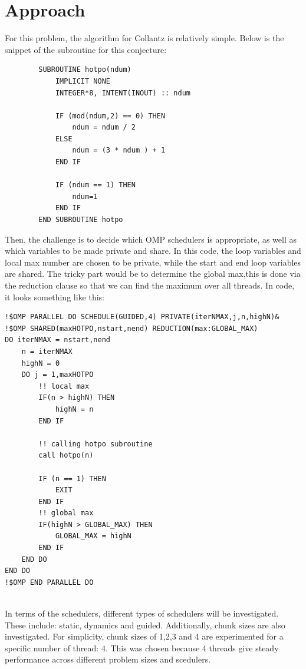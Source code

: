 \documentclass[12pt]{article}
\begin{document}
        \section{Approach}
            For this problem, the algorithm for Collantz is relatively simple. Below is the snippet of the subroutine for this conjecture:
            \begin{lstlisting}
        SUBROUTINE hotpo(ndum)
            IMPLICIT NONE
            INTEGER*8, INTENT(INOUT) :: ndum

            IF (mod(ndum,2) == 0) THEN
                ndum = ndum / 2 
            ELSE
                ndum = (3 * ndum ) + 1
            END IF

            IF (ndum == 1) THEN
                ndum=1
            END IF
        END SUBROUTINE hotpo                
            \end{lstlisting}
        \newpage
        \noindent
        Then, the challenge is to decide which OMP schedulers is appropriate, as well as which variables to be made private and share.  In this code, the loop variables and local max number are chosen to be private, while the start and end loop variables are shared.  The tricky part would be to determine the global max,this is done via the reduction clause so that we can find the maximum over all threads. In code, it looks something like this:

        \begin{lstlisting}
!$OMP PARALLEL DO SCHEDULE(GUIDED,4) PRIVATE(iterNMAX,j,n,highN)&
!$OMP SHARED(maxHOTPO,nstart,nend) REDUCTION(max:GLOBAL_MAX) 
DO iterNMAX = nstart,nend
    n = iterNMAX
    highN = 0
    DO j = 1,maxHOTPO         
        !! local max 
        IF(n > highN) THEN 
            highN = n 
        END IF
        
        !! calling hotpo subroutine 
        call hotpo(n)

        IF (n == 1) THEN 
            EXIT 
        END IF
        !! global max 
        IF(highN > GLOBAL_MAX) THEN 
            GLOBAL_MAX = highN
        END IF
    END DO
END DO
!$OMP END PARALLEL DO 
        
        \end{lstlisting}                

        In terms of the schedulers, different types of schedulers will be investigated.  These include: static, dynamics and guided. Additionally, chunk sizes are also investigated.  For simplicity, chunk sizes of 1,2,3 and 4 are experimented for a specific number of thread: 4.  This was chosen because 4 threads give steady performance across different problem sizes and scedulers.   
    
\end{document}

